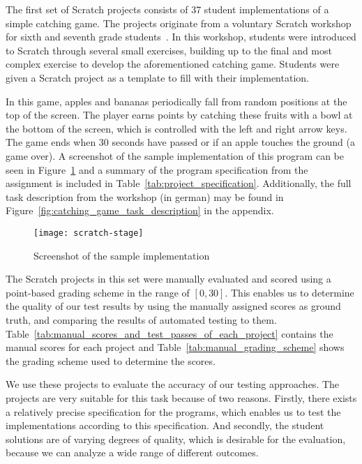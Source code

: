 The first set of Scratch projects consists of 37 student implementations of a simple catching game.
The projects originate from a voluntary Scratch workshop for sixth and seventh grade students~\cite{keller}.
In this workshop, students were introduced to Scratch through several small exercises,
building up to the final and most complex exercise to develop the aforementioned catching game.
Students were given a Scratch project as a template to fill with their implementation.
\parspace

In this game, apples and bananas periodically fall from random positions at the top of the screen.
The player earns points by catching these fruits with a bowl at the bottom of the screen,
which is controlled with the left and right arrow keys.
The game ends when 30 seconds have passed or if an apple touches the ground (a game over).
A screenshot of the sample implementation of this program can be seen in Figure~\ref{fig:screenshot_of_the_sample_implementation}
and a summary of the program specification from the assignment is included in Table~\ref{tab:project_specification}.
Additionally, the full task description from the workshop (in german) may be found in Figure~\ref{fig:catching_game_task_description} in the appendix.
\parspace

\begin{figure}[htpb]
    \centering
    \texttt{[image: scratch-stage]}
    \caption{Screenshot of the sample implementation}
    \label{fig:screenshot_of_the_sample_implementation}
\end{figure}

The Scratch projects in this set were manually evaluated and scored using a point-based grading scheme in the range of $[0, 30]$.
This enables us to determine the quality of our test results by using the manually assigned scores as ground truth,
and comparing the results of automated testing to them.
Table~\ref{tab:manual_scores_and_test_passes_of_each_project} contains the manual scores for each project and
Table~\ref{tab:manual_grading_scheme} shows the grading scheme used to determine the scores.
\parspace

We use these projects to evaluate the accuracy of our testing approaches.
The projects are very suitable for this task because of two reasons.
Firstly, there exists a relatively precise specification for the programs,
which enables us to test the implementations according to this specification.
And secondly, the student solutions are of varying degrees of quality,
which is desirable for the evaluation,
because we can analyze a wide range of different outcomes.
\parspace

